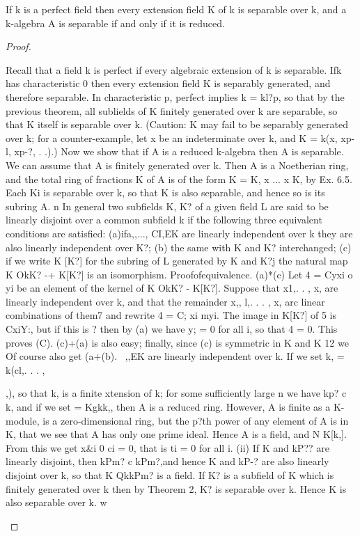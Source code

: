 \begin{theorem}[Theorem 26.3]\label{mcrt-auto-theorem-26-3}\uses{}
\begin{mathematicalrecord}
If k is a perfect field then every extension field K of k is
 separable over k, and a k-algebra A is separable if and only if it is reduced.
\end{mathematicalrecord}
\end{theorem}
\begin{proof}
\begin{mathematicalrecord}
Recall that a field k is perfect if every algebraic extension of k is
 separable. Ifk has characteristic 0 then every extension field K is separably
 generated, and therefore separable. In characteristic p, perfect implies
 k = kl?p, so that by the previous theorem, all sublields of K finitely
generated over k are separable, so that K itself is separable over k. (Caution:
K may fail to be separably generated over k; for a counter-example, let x
be an indeterminate over k, and K = k(x, xp-l, xp-?, . .).) Now we show
that if A is a reduced k-algebra then A is separable. We can assume that
A is finitely generated over k. Then A is a Noetherian ring, and the total
ring of fractions K of A is of the form K = K, x ... x K, by Ex. 6.5. Each
Ki is separable over k, so that K is also separable, and hence so is its
 subring A. n
   In general two subfields K, K? of a given field L are said to be linearly
disjoint over a common subfield k if the following three equivalent
conditions are satisfied:
   (a)ifa,,...,     CI,EK are linearly independent over k they are also linearly
independent over K?;
   (b) the same with K and K? interchanged;
   (c) if we write K [K?] for the subring of L generated by K and K?j the
natural map K OkK? -+ K[K?] is an isomorphism.
Proofofequivalence.        (a)*(c) Let 4 = Cyxi o yi be an element of the kernel
of K OkK? - K[K?].             Suppose that x1,. . , x, are linearly independent
over k, and that the remainder x,, l,. . . , x, arc linear combinations of them7
and rewrite 4 = C; xi myi. The image in K[K?] of 5 is CxiY:, but if this is ?
then by (a) we have y; = 0 for all i, so that 4 = 0. This proves (C).
   (c)+(a)      is also easy; finally, since (c) is symmetric in K and K 12 we Of
course also get (a+(b).
~,,EK are linearly independent over k. If
                               we set k, = k(cl,. . . , {,), so that k, is a finite
 xtension of k; for some sufficiently large n we have kp? c k, and if we set
   = Kgkk,,      then A is a reduced ring. However, A is finite as a K-module,
    is a zero-dimensional ring, but the p?th power of any element of A is in K,
     that we see that A has only one prime ideal. Hence A is a field, and
   N K[k,]. From this we get x&i 0 ci = 0, that is ti = 0 for all i.
   (ii) If K and kP?? are linearly disjoint, then kPm? c kPm?,and hence K and kP-?
are also linearly disjoint over k, so that K QkkPm? is a field. If K? is a subfield
of K which is finitely generated over k then by Theorem 2, K? is separable
over k. Hence K is also separable over k. w



}
\end{mathematicalrecord}
\end{proof}

